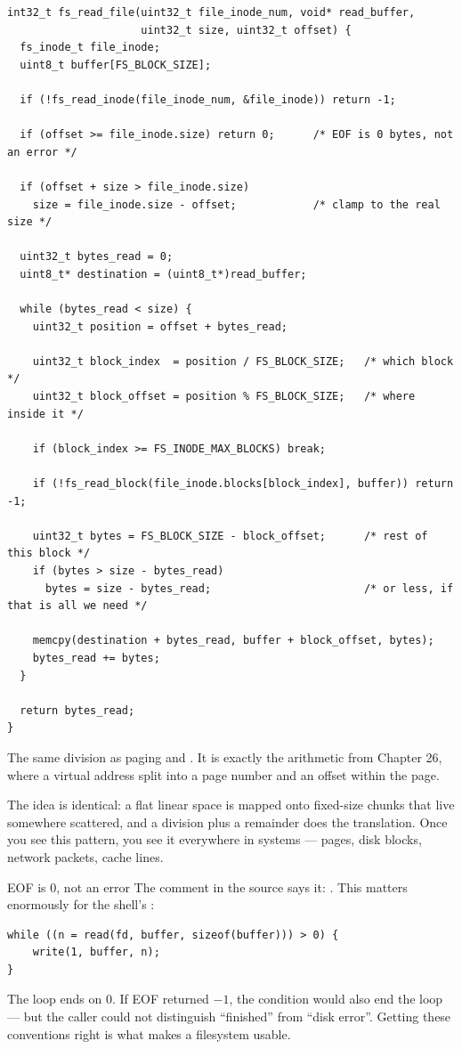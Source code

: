\begin{lstlisting}[style=c]
int32_t fs_read_file(uint32_t file_inode_num, void* read_buffer,
                     uint32_t size, uint32_t offset) {
  fs_inode_t file_inode;
  uint8_t buffer[FS_BLOCK_SIZE];

  if (!fs_read_inode(file_inode_num, &file_inode)) return -1;

  if (offset >= file_inode.size) return 0;      /* EOF is 0 bytes, not an error */

  if (offset + size > file_inode.size)
    size = file_inode.size - offset;            /* clamp to the real size */

  uint32_t bytes_read = 0;
  uint8_t* destination = (uint8_t*)read_buffer;

  while (bytes_read < size) {
    uint32_t position = offset + bytes_read;

    uint32_t block_index  = position / FS_BLOCK_SIZE;   /* which block */
    uint32_t block_offset = position % FS_BLOCK_SIZE;   /* where inside it */

    if (block_index >= FS_INODE_MAX_BLOCKS) break;

    if (!fs_read_block(file_inode.blocks[block_index], buffer)) return -1;

    uint32_t bytes = FS_BLOCK_SIZE - block_offset;      /* rest of this block */
    if (bytes > size - bytes_read)
      bytes = size - bytes_read;                        /* or less, if that is all we need */

    memcpy(destination + bytes_read, buffer + block_offset, bytes);
    bytes_read += bytes;
  }

  return bytes_read;
}
\end{lstlisting}

\begin{concept}{The same division as paging}
 and . It is exactly the arithmetic from
Chapter 26, where a virtual address split into a page number and an offset within the page.

The idea is identical: a flat linear space is mapped onto fixed-size chunks that live somewhere
scattered, and a division plus a remainder does the translation. Once you see this pattern, you see
it everywhere in systems --- pages, disk blocks, network packets, cache lines.
\end{concept}

\begin{warn}{EOF is 0, not an error}
The comment in the source says it: . This
matters enormously for the shell's :
\begin{lstlisting}[style=c]
while ((n = read(fd, buffer, sizeof(buffer))) > 0) {
    write(1, buffer, n);
}
\end{lstlisting}
The loop ends on 0. If EOF returned $-1$, the condition  would also end the loop --- but
the caller could not distinguish ``finished'' from ``disk error''. Getting these conventions right is
what makes a filesystem usable.
\end{warn}

